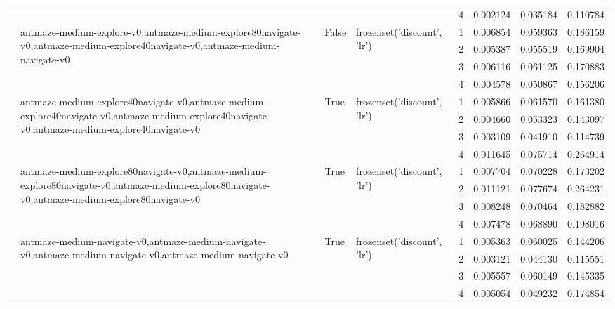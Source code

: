 \begin{tabular}{lllllrrr}
 &  &  &  & 4 & 0.002124 & 0.035184 & 0.110784 \\
\cline{2-8} \cline{3-8} \cline{4-8}
 & \multirow[t]{4}{*}{antmaze-medium-explore-v0,antmaze-medium-explore80navigate-v0,antmaze-medium-explore40navigate-v0,antmaze-medium-navigate-v0} & \multirow[t]{4}{*}{False} & \multirow[t]{4}{*}{frozenset({'discount', 'lr'})} & 1 & 0.006854 & 0.059363 & 0.186159 \\
 &  &  &  & 2 & 0.005387 & 0.055519 & 0.169904 \\
 &  &  &  & 3 & 0.006116 & 0.061125 & 0.170883 \\
 &  &  &  & 4 & 0.004578 & 0.050867 & 0.156206 \\
\cline{2-8} \cline{3-8} \cline{4-8}
 & \multirow[t]{4}{*}{antmaze-medium-explore40navigate-v0,antmaze-medium-explore40navigate-v0,antmaze-medium-explore40navigate-v0,antmaze-medium-explore40navigate-v0} & \multirow[t]{4}{*}{True} & \multirow[t]{4}{*}{frozenset({'discount', 'lr'})} & 1 & 0.005866 & 0.061570 & 0.161380 \\
 &  &  &  & 2 & 0.004660 & 0.053323 & 0.143097 \\
 &  &  &  & 3 & 0.003109 & 0.041910 & 0.114739 \\
 &  &  &  & 4 & 0.011645 & 0.075714 & 0.264914 \\
\cline{2-8} \cline{3-8} \cline{4-8}
 & \multirow[t]{4}{*}{antmaze-medium-explore80navigate-v0,antmaze-medium-explore80navigate-v0,antmaze-medium-explore80navigate-v0,antmaze-medium-explore80navigate-v0} & \multirow[t]{4}{*}{True} & \multirow[t]{4}{*}{frozenset({'discount', 'lr'})} & 1 & 0.007704 & 0.070228 & 0.173202 \\
 &  &  &  & 2 & 0.011121 & 0.077674 & 0.264231 \\
 &  &  &  & 3 & 0.008248 & 0.070464 & 0.182882 \\
 &  &  &  & 4 & 0.007478 & 0.068890 & 0.198016 \\
\cline{2-8} \cline{3-8} \cline{4-8}
 & \multirow[t]{4}{*}{antmaze-medium-navigate-v0,antmaze-medium-navigate-v0,antmaze-medium-navigate-v0,antmaze-medium-navigate-v0} & \multirow[t]{4}{*}{True} & \multirow[t]{4}{*}{frozenset({'discount', 'lr'})} & 1 & 0.005363 & 0.060025 & 0.144206 \\
 &  &  &  & 2 & 0.003121 & 0.044130 & 0.115551 \\
 &  &  &  & 3 & 0.005557 & 0.060149 & 0.145335 \\
 &  &  &  & 4 & 0.005054 & 0.049232 & 0.174854 \\
\cline{1-8} \cline{2-8} \cline{3-8} \cline{4-8}

\end{tabular}
